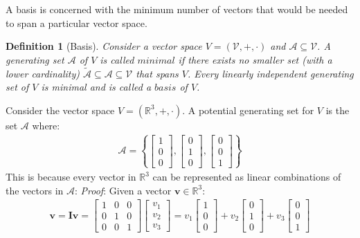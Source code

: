 \documentclass[a4paper,12pt]{book}
\newcommand{\set}[1]{\mathcal{#1}}
\newcommand{\matrx}[1]{\bm{#1}}
\newcommand{\vectr}[1]{\textbf{#1}}
\newcommand{\real}{\mathbb{R}}
\newcommand{\italic}[1]{\textit{#1}}
\newtheorem{definition}{Definition}[section]
\begin{document}
	A basis is concerned with the minimum number of vectors that would be needed to span a particular vector space. 
	\begin{definition}[Basis]
		\normalfont Consider a vector space $\italic{V} = (\set{V}, +, \cdot)$ and $\set{A} \subseteq \set{V}$. A generating set $\set{A}$ of $\italic{V}$ is called $\italic{minimal}$ if there exists no smaller set (with a lower cardinality) $\set{\tilde{A}} \subseteq \set{A} \subseteq \set{V}$ that spans $\italic{V}$. Every linearly independent generating set of $\italic{V}$  is minimal and is called a $\italic{basis}$ of $\italic{V}$.
		\label{def:basis}
	\end{definition}
	Consider the vector space $ \italic{V} = (\real^{3}, +, \cdot) $. A potential generating set for $ \italic{V} $ is the set $ \set{A} $ where:
	\begin{align}
		\set{A} = \left\{\begin{bmatrix} 1 \\ 0 \\ 0  \end{bmatrix},\begin{bmatrix} 0 \\ 1 \\ 0 \end{bmatrix},\begin{bmatrix} 0 \\ 0 \\ 1 \end{bmatrix} \right\}
	\end{align}
	This is because every vector in $ \real^{3} $ can be represented as linear combinations of the vectors in $ \set{A} $:
	\italic{Proof}: Given a vector $ \vectr{v} \in \real^{3} $:
	\begin{align}
		\vectr{v} = \matrx{I}\vectr{v} = \begin{bmatrix}
			1 & 0 & 0 \\
			0 & 1 & 0 \\
			0 & 0 & 1 
		\end{bmatrix} \begin{bmatrix}
			v_1 \\
			v_2 \\
			v_3
		\end{bmatrix} = v_1 \begin{bmatrix}
			1 \\ 0 \\ 0
		\end{bmatrix} + v_2 \begin{bmatrix}
			0 \\ 1 \\ 0 
		\end{bmatrix} + v_3 \begin{bmatrix}
			0 \\ 0 \\ 1
		\end{bmatrix}
	\end{align}
	
\end{document}
